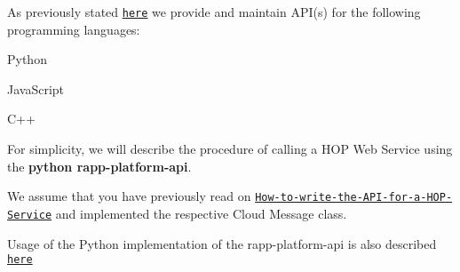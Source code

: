 As previously stated \href{https://github.com/rapp-project/rapp-platform/wiki/How-to-write-the-API-for-a-HOP-service%3F}{\tt here} we provide and maintain A\-P\-I(s) for the following programming languages\-:


\begin{DoxyItemize}
\item Python
\item Java\-Script
\item C++
\end{DoxyItemize}

For simplicity, we will describe the procedure of calling a H\-O\-P Web Service using the {\bfseries python rapp-\/platform-\/api}.

We assume that you have previously read on \href{https://github.com/rapp-project/rapp-platform/wiki/How-to-write-the-API-for-a-HOP-service%3F}{\tt How-\/to-\/write-\/the-\/\-A\-P\-I-\/for-\/a-\/\-H\-O\-P-\/\-Service} and implemented the respective Cloud Message class.

Usage of the Python implementation of the rapp-\/platform-\/api is also described \href{https://github.com/rapp-project/rapp-api/tree/master/python#calling-rapp-platform-services---api-usage}{\tt here} 